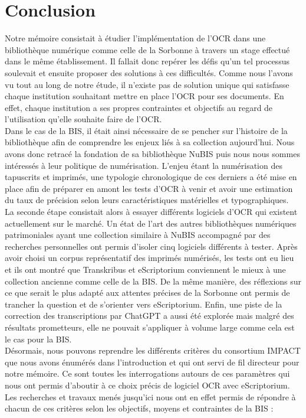 \documentclass[a4paper,12pt,twoside]{book}
\begin{document}
	
	\chapter*{Conclusion}
	
Notre mémoire consistait à étudier l'implémentation de l'OCR dans une
bibliothèque numérique comme celle de la Sorbonne à travers un stage
effectué dans le même établissement. Il fallait donc repérer les défis
qu'un tel processus soulevait et ensuite proposer des solutions à ces
difficultés. Comme nous l'avons vu tout au long de notre étude, il
n'existe pas de solution unique qui satisfasse chaque institution
souhaitant mettre en place l'OCR pour ses documents. En effet, chaque
institution a ses propres contraintes et objectifs au regard de
l'utilisation qu'elle souhaite faire de l'OCR. \\

Dans le cas de la BIS, il était ainsi nécessaire de se pencher sur
l'histoire de la bibliothèque afin de comprendre les enjeux liés à sa
collection aujourd'hui. Nous avons donc retracé la fondation de sa
bibliothèque NuBIS puis nous nous sommes intéressés à leur politique de
numérisation. L'enjeu étant la numérisation des tapuscrits et imprimés,
une typologie chronologique de ces derniers a été mise en place afin de
préparer en amont les tests d'OCR à venir et avoir une estimation du
taux de précision selon leurs caractéristiques matérielles et
typographiques.\\

La seconde étape consistait alors à essayer différents logiciels d'OCR
qui existent actuellement sur le marché. Un état de l'art des autres
bibliothèques numériques patrimoniales ayant une collection similaire à NuBIS
accompagné par des recherches personnelles ont permis d'isoler cinq
logiciels différents à tester. Après avoir choisi un corpus
représentatif des imprimés numérisés, les tests ont eu lieu et ils ont
montré que Transkribus et eScriptorium conviennent le mieux à une
collection ancienne comme celle de la BIS. De la même manière, des
réflexions sur ce que serait le plus adapté aux attentes précises de la
Sorbonne ont permis de trancher la question et de s'orienter vers
eScriptorium. Enfin, une piste de la correction des transcriptions par
ChatGPT a aussi été explorée mais malgré des résultats prometteurs, elle ne pouvait s'appliquer à volume large comme cela est le cas pour la BIS. \\

Désormais, nous pouvons reprendre les différents critères du consortium IMPACT que nous avons énumérés dans l'introduction et qui ont servi de fil directeur pour notre mémoire. Ce sont toutes les interrogations autours de ces paramètres qui nous ont permis d'aboutir à ce choix précis de logiciel OCR avec eScriptorium. Les recherches et travaux menés jusqu'ici nous ont en effet permis de répondre à chacun de ces critères selon les objectifs, moyens et contraintes de la BIS : \\
\end{document}
